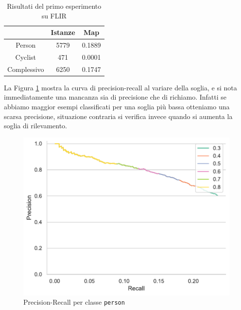 \begin{table}[]
    \centering
    \begin{tabular}{c|c|c|}
    \cline{2-3}
     & Istanze & Map \\ \hline
    \multicolumn{1}{|c|}{Person} & 5779 & 0.1889 \\ \hline
    \multicolumn{1}{|c|}{Cyclist} & 471 & 0.0001 \\ \hline
    \multicolumn{1}{|c|}{Complessivo} & 6250 & 0.1747 \\ \hline
    \end{tabular}
    \caption{Risultati del primo esperimento su FLIR}
    \label{tab:first_experiment_flir}
\end{table}
La Figura \ref{fig:precision_recall_person_1} mostra la curva di precision-recall al variare della soglia, e si nota immediatamente una mancanza sia di precisione che di richiamo. Infatti se abbiamo maggior esempi classificati per una soglia più bassa otteniamo una scarsa precisione, situazione contraria si verifica invece quando si aumenta la soglia di rilevamento.  
\begin{figure}[]
    \centering
    \includegraphics[width=\textwidth]{images/graphic/precision_recall_test_flir_kaist.pdf}
    \caption{Precision-Recall per classe \texttt{person}}
    \label{fig:precision_recall_person_1}
\end{figure}






